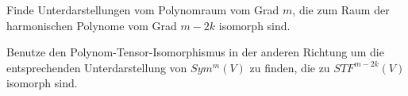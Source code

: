 \begin{sheet}
\begin{problem}[title={Isomorphismus zwischen irreduziblen Darstellungen von Polynomen und Tensoren}]
\begin{subproblem}
Finde Unterdarstellungen vom Polynomraum vom Grad $m$, die zum Raum der harmonischen Polynome vom Grad $m-2k$ isomorph sind.
\end{subproblem}
\begin{subproblem}
Benutze den Polynom-Tensor-Isomorphismus in der anderen Richtung um die entsprechenden Unterdarstellung von $Sym^m(V)$ zu finden, die zu $STF^{m-2k}(V)$ isomorph sind.
\end{subproblem}
\end{problem}

\end{sheet}